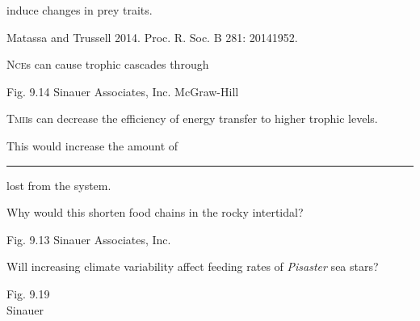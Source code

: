 \documentclass[t]{beamer}
\begin{document}
%
{
\begin{frame}[b]
\end{frame}
}
%
{
\begin{frame}[b]{ induce changes in prey traits.}

	\hfill \tiny Matassa and Trussell 2014. Proc. R. Soc. B 281: 20141952.
\end{frame}
}
%
{
\begin{frame}[b]{\textsc{Nce}s can cause trophic cascades through }

	\tiny Fig. 9.14 \textcopyright Sinauer Associates, Inc. \hfill \textcopyright McGraw-Hill

	 \pause
\end{frame}
}
%
{
\begin{frame}[t]{\textsc{Tmii}s can decrease the efficiency of energy transfer to higher trophic levels.}

	\vspace*{2\baselineskip}

	\hspace*{75mm}\parbox{45mm}{\raggedright This would increase the amount of \rule{1.5cm}{0.4pt} lost from the system.}

	\vspace*{2\baselineskip}
	
	\hspace*{75mm}\parbox{45mm}{\raggedright Why would this shorten food chains in the rocky intertidal?}

	\vfilll
	
	\hfill \tiny Fig. 9.13 \textcopyright Sinauer Associates, Inc.
\end{frame}
}
%
{
\begin{frame}[b]{Will increasing climate variability affect feeding rates of \textit{Pisaster} sea stars?}

\hfill \tiny Fig. 9.19\\\hfill\textcopyright Sinauer
\end{frame}
}
\end{document}
